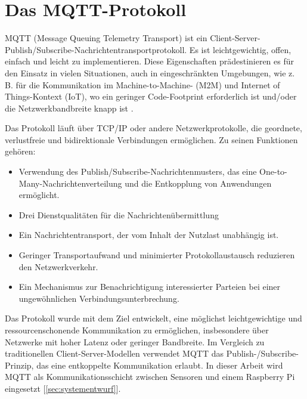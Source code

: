 \section{Das MQTT-Protokoll}
\label{sec:mqtt}

MQTT (Message Queuing  Telemetry Transport)  ist ein Client-Server-Publish/Subscribe-Nachrichtentransportprotokoll. Es ist leichtgewichtig, offen, einfach und leicht zu implementieren. Diese Eigenschaften prädestinieren es für den Einsatz in vielen Situationen, auch in eingeschränkten Umgebungen, wie z. B. für die Kommunikation im Machine-to-Machine- (M2M) und Internet of Things-Kontext (IoT), wo ein geringer Code-Footprint erforderlich ist und/oder die Netzwerkbandbreite knapp ist \cite[Abstract]{oasis_mqtt_spec}.

Das Protokoll läuft über TCP/IP oder andere Netzwerkprotokolle, die geordnete, verlustfreie und bidirektionale Verbindungen ermöglichen. Zu seinen Funktionen gehören:

\begin{itemize}

\item Verwendung des Publish/Subscribe-Nachrichtenmusters, das eine One-to-Many-Nachrichtenverteilung und die Entkopplung von Anwendungen ermöglicht.

\item Drei Dienstqualitäten für die Nachrichtenübermittlung

\item Ein Nachrichtentransport, der vom Inhalt der Nutzlast unabhängig ist.

\item Geringer Transportaufwand und minimierter Protokollaustausch reduzieren den Netzwerkverkehr.

\item Ein Mechanismus zur Benachrichtigung interessierter Parteien bei einer ungewöhnlichen Verbindungsunterbrechung.

\end{itemize}


Das Protokoll wurde mit dem Ziel entwickelt, eine möglichst leichtgewichtige und ressourcenschonende Kommunikation zu ermöglichen, insbesondere über Netzwerke mit hoher Latenz oder geringer Bandbreite. Im Vergleich zu traditionellen Client-Server-Modellen verwendet MQTT das Publish-/Subscribe-Prinzip, das eine entkoppelte Kommunikation erlaubt. In dieser Arbeit wird MQTT als Kommunikationsschicht zwischen Sensoren und einem Raspberry Pi eingesetzt [\ref{sec:systementwurf}].

